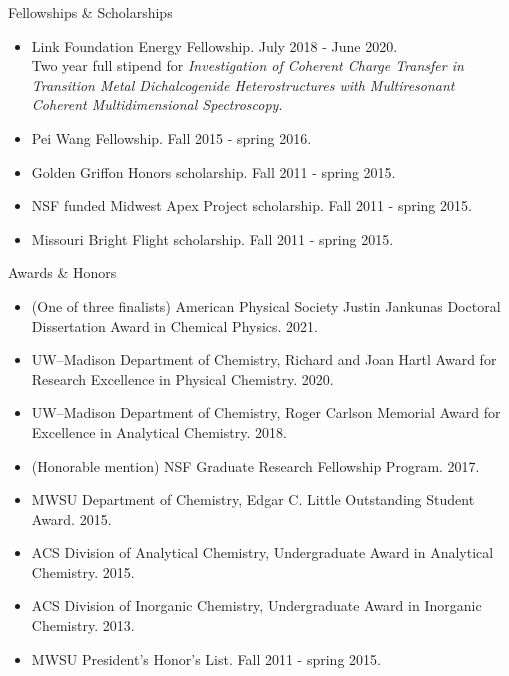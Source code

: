 \documentclass{resume} %
\begin{document}
\begin{rSection}{Fellowships \& Scholarships}
	
\begin{itemize}[leftmargin = 0 pt]
	\item Link Foundation Energy Fellowship. July 2018 - June 2020. \\
	Two year full stipend for \emph{Investigation of Coherent Charge Transfer in Transition Metal Dichalcogenide Heterostructures with Multiresonant Coherent Multidimensional Spectroscopy}.
	\item Pei Wang Fellowship. Fall 2015 - spring 2016.
	\item Golden Griffon Honors scholarship. Fall 2011 - spring 2015.
	\item NSF funded Midwest Apex Project scholarship. Fall 2011 - spring 2015.
	\item Missouri Bright Flight scholarship. Fall 2011 - spring 2015.
\end{itemize}
	
\end{rSection}


\begin{rSection}{Awards \& Honors}

\begin{itemize}[leftmargin = 0 pt]
	\item (One of three finalists) American Physical Society Justin Jankunas Doctoral Dissertation Award in Chemical Physics. 2021.
	\item UW--Madison Department of Chemistry, Richard and Joan Hartl Award for Research Excellence in Physical Chemistry. 2020.
	\item UW--Madison Department of Chemistry, Roger Carlson Memorial Award for Excellence in Analytical Chemistry. 2018.
	\item (Honorable mention) NSF Graduate Research Fellowship Program. 2017.
	\item MWSU Department of Chemistry, Edgar C. Little Outstanding Student Award. 2015.
	\item ACS Division of Analytical Chemistry, Undergraduate Award in Analytical Chemistry. 2015. 
	\item ACS Division of Inorganic Chemistry, Undergraduate Award in Inorganic Chemistry. 2013.
	\item MWSU President’s Honor’s List. Fall 2011 - spring 2015.
\end{itemize}

\end{rSection}
\end{document}
